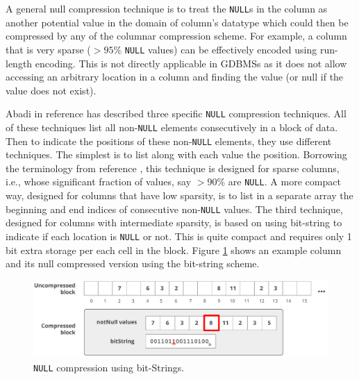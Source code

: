 A general null compression technique is to treat the \texttt{NULL}s in the column as another potential value in the domain of column's datatype which could then be compressed by any of the columnar compression scheme. For example, a column that is very sparse ($>95\%$ \texttt{NULL} values) can be effectively encoded using run-length encoding. This is not directly applicable in GDBMSs as it does not allow accessing an arbitrary location in a column and finding the value (or null if the value does not exist).

Abadi in reference \cite{abadi-sparse-col} has described three specific \texttt{NULL} compression techniques. All of these techniques list all non-\texttt{NULL} elements consecutively in a block of data. Then to indicate the positions of these non-\texttt{NULL} elements, they use different techniques. The simplest is to list along with each value the position. Borrowing the terminology from reference \cite{abadi-sparse-col}, this technique is designed for sparse columns, i.e., whose significant fraction of values, say $> 90\%$ are \texttt{NULL}. A more compact way, designed for columns that have low sparsity, is to list in a separate array the beginning and end indices of consecutive non-\texttt{NULL} values. The third technique, designed for columns with intermediate sparsity, is based on using bit-string to indicate if each location is \texttt{NULL} or not.  This is quite compact and requires only 1 bit extra storage per each cell in the block. Figure \ref{fig:null1} shows an example column and its null compressed version using the bit-string scheme. 

\begin{figure}
	\hfill\includegraphics[scale=0.70]{img/null1}\hspace*{\fill}
	\captionsetup{justification=centering}
	\caption{\texttt{NULL} compression using bit-Strings.}
	\label{fig:null1}
\end{figure}


